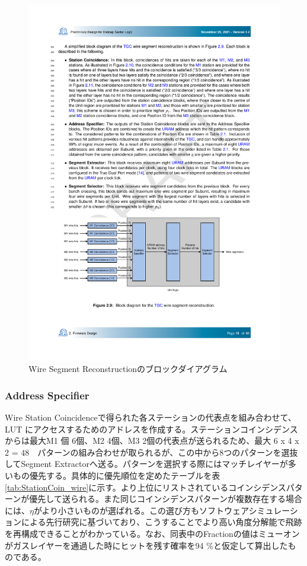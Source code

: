 \begin{figure} 
\centering
\includegraphics[width=16cm]{fig/SL/SegReco_wire.pdf}
\caption[Wire Segment Reconstructionのブロックダイアグラム]{Wire Segment Reconstructionのブロックダイアグラム\cite{SLPDR}}
\label{SegReco_wire}
\end{figure}

\subsubsection*{Address Specifier}
Wire Station Coincidenceで得られた各ステーションの代表点を組み合わせて、LUT にアクセスするためのアドレスを作成する。ステーションコインシデンスからは最大M1 個 6個、M2 4個、M3 2個の代表点が送られるため、最大 6 x 4 x 2 = 48　パターンの組み合わせが取られるが、この中から8つのパターンを選抜してSegment Extractorへ送る。パターンを選択する際にはマッチレイヤーが多いもの優先する。具体的に優先順位を定めたテーブルを表\ref{tab:StationCoin_wire}に示す。より上位にリストされているコインシデンスパターンが優先して送られる。また同じコインシデンスパターンが複数存在する場合には、$\eta$がより小さいものが選ばれる。この選び方もソフトウェアシミュレーションによる先行研究に基づいており、こうすることでより高い角度分解能で飛跡を再構成できることがわかっている。なお、同表中のFractionの値はミューオンがガスレイヤーを通過した時にヒットを残す確率を94 \%と仮定して算出したものである。


